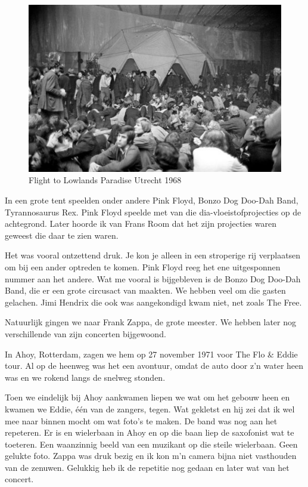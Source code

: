 \documentclass[10pt,twoside, openright]{memoir}
\begin{document}
\begin{figure}
\includegraphics[width=\textwidth]{img/181-flightutrecht}
\caption*{\footnotesize Flight to Lowlands Paradise Utrecht 1968}
\end{figure}

In een grote tent speelden onder andere Pink Floyd, Bonzo Dog Doo-Dah Band, Tyrannosaurus Rex. Pink Floyd speelde met van die dia-vloeistofprojecties op de achtegrond. Later hoorde ik van Frans Room dat het zijn projecties waren geweest die daar te zien waren.

Het was vooral ontzettend druk. Je kon je alleen in een stroperige rij verplaatsen om bij een ander optreden te komen. 
Pink Floyd reeg het ene uitgesponnen nummer aan het andere. Wat me vooral is bijgebleven is de Bonzo Dog Doo-Dah Band, die er een grote circusact van maakten. We hebben veel om die gasten gelachen. Jimi Hendrix die ook was aangekondigd kwam niet, net zoals The Free.

Natuurlijk gingen we naar Frank Zappa, de grote meester. We hebben later nog verschillende van zijn concerten bijgewoond.

In Ahoy, Rotterdam, zagen we hem op 27 november 1971 voor The Flo & Eddie tour. Al op de heenweg was het een avontuur, omdat de auto door z’n water heen was en we rokend langs de snelweg stonden. 

Toen we eindelijk bij Ahoy aankwamen liepen we wat om het gebouw heen en kwamen we Eddie, één van de zangers, tegen. Wat gekletst en hij zei dat ik wel mee naar binnen mocht om wat foto's te maken. De band was nog aan het repeteren. Er is en wielerbaan in Ahoy en op die baan liep de saxofonist wat te toeteren. Een waanzinnig beeld van een muzikant op die steile wielerbaan. Geen gelukte foto. Zappa was druk bezig en ik kon m’n camera bijna niet vasthouden van de zenuwen. Gelukkig heb ik de repetitie nog gedaan en later wat van het concert.
\end{document}
